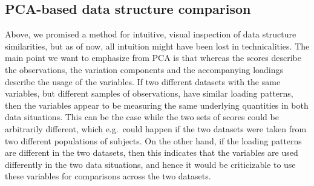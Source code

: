 \documentclass[titlepage,11pt,twoside]{article}
\DeclareMathOperator*{\V}{V}
\newcommand{\argmax}{\text{argmax}}
\begin{document}
%

\subsection{PCA-based data structure comparison}
Above, we promised a method for intuitive, visual inspection of data structure similarities, but as of now, all intuition might have been lost in technicalities. The main point we want to emphasize from PCA is that whereas the scores describe the observations, the variation components and the accompanying loadings describe the usage of the variables. If two different datasets with the same variables, but different samples of observations, have similar loading patterns, then the variables appear to be measuring the same underlying quantities in both data situations. This can be the case while the two sets of scores could be arbitrarily different, which e.g.\ could happen if the two datasets were taken from two different populations of subjects. On the other hand, if the loading patterns are different in the two datasets, then this indicates that the variables are used differently in the two data situations, and hence it would be criticizable to use these variables for comparisons across the two datasets.  

\end{document}
